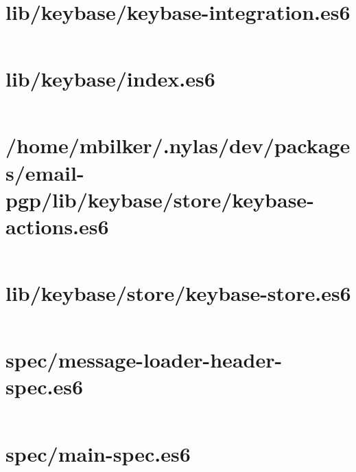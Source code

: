 \documentclass[10pt, letterpaper]{article}
\begin{document}
\section{lib/keybase/keybase-integration.es6}
\inputminted{javascript}{/home/mbilker/.nylas/dev/packages/email-pgp/lib/keybase/keybase-integration.es6}

\section{lib/keybase/index.es6}
\inputminted{javascript}{/home/mbilker/.nylas/dev/packages/email-pgp/lib/keybase/index.es6}

\section{/home/mbilker/.nylas/dev/packages/email-pgp/lib/keybase/store/keybase-actions.es6}
\inputminted{javascript}{/home/mbilker/.nylas/dev/packages/email-pgp/lib/keybase/store/keybase-actions.es6}

\section{lib/keybase/store/keybase-store.es6}
\inputminted{javascript}{/home/mbilker/.nylas/dev/packages/email-pgp/lib/keybase/store/keybase-store.es6}


\section{spec/message-loader-header-spec.es6}
\inputminted{javascript}{/home/mbilker/.nylas/dev/packages/email-pgp/spec/message-loader-header-spec.es6}

\section{spec/main-spec.es6}
\inputminted{javascript}{/home/mbilker/.nylas/dev/packages/email-pgp/spec/main-spec.es6}

\end{document}

